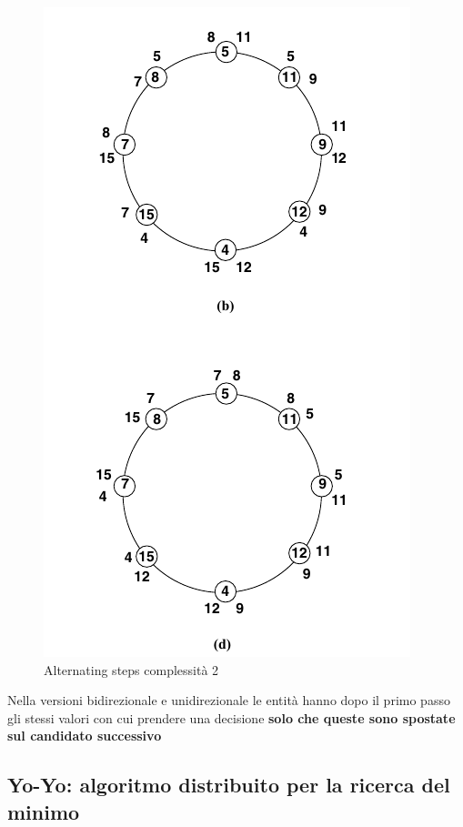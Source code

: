 \documentclass[12pt]{article}
\begin{document}
			\begin{figure}[h!]
				\centering
				\includegraphics[scale=0.40]{img/uni.png}
				\caption{Alternating steps complessità 2}
			\end{figure}
			Nella versioni bidirezionale e unidirezionale le entità hanno dopo il primo passo gli stessi valori con cui prendere una decisione \textbf{ solo che queste sono spostate sul candidato successivo} 
			
			
	\subsection{Yo-Yo: algoritmo distribuito per la ricerca del minimo}
		
\end{document}
